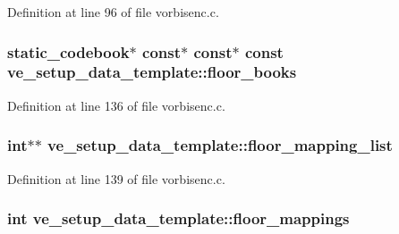 Definition at line 96 of file vorbisenc.\+c.

\subsubsection[{\texorpdfstring{floor\+\_\+books}{floor_books}}]{ {\bf static\+\_\+codebook}$\ast$ {\bf const}$\ast$ {\bf const}$\ast$ {\bf const} ve\+\_\+setup\+\_\+data\+\_\+template\+::floor\+\_\+books}\hypertarget{structve__setup__data__template_acdb6d67e5637a4c75a43ec70edc80d56}{}\label{structve__setup__data__template_acdb6d67e5637a4c75a43ec70edc80d56}


Definition at line 136 of file vorbisenc.\+c.

\subsubsection[{\texorpdfstring{floor\+\_\+mapping\+\_\+list}{floor_mapping_list}}]{ {\bf int}$\ast$$\ast$ ve\+\_\+setup\+\_\+data\+\_\+template\+::floor\+\_\+mapping\+\_\+list}\hypertarget{structve__setup__data__template_a3251bd75c47300d53a68cdab42052df6}{}\label{structve__setup__data__template_a3251bd75c47300d53a68cdab42052df6}


Definition at line 139 of file vorbisenc.\+c.

\subsubsection[{\texorpdfstring{floor\+\_\+mappings}{floor_mappings}}]{ {\bf int} ve\+\_\+setup\+\_\+data\+\_\+template\+::floor\+\_\+mappings}\hypertarget{structve__setup__data__template_aeef323dc0bb8a405c9a0eba0e41b6453}{}\label{structve__setup__data__template_aeef323dc0bb8a405c9a0eba0e41b6453}


